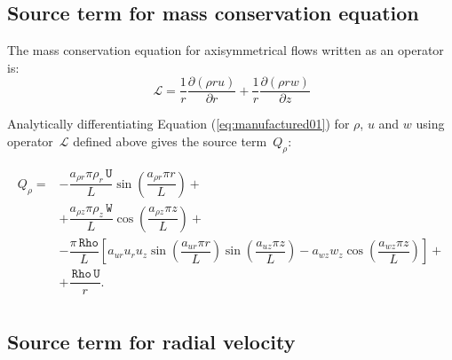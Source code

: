 \documentclass[10pt]{article}
\newcommand{\Diff}[2] {\dfrac{\partial( #1)}{\partial #2}}
\newcommand{\Lo}{\,\mathcal{L}}
\newcommand{\Rho}{\,\mathtt{Rho}}
\newcommand{\U}{\,\mathtt{U}}
\newcommand{\W}{\,\mathtt{W}}
\begin{document}
\subsection{Source term for mass conservation equation}

The mass conservation equation for axisymmetrical flows written as an operator is:
\begin{equation*}
 \Lo=  \dfrac{1}{r} \Diff{\rho r u}{r}+ \dfrac{1}{r}\Diff{\rho r w}{z}
\end{equation*}

Analytically differentiating Equation (\ref{eq:manufactured01}) for $\rho$, $u$ and $w$ using operator $\Lo$ defined above gives  the source term~$Q_{\rho}$:

\begin{equation}
 \begin{split}
Q_\rho  = &- \dfrac{a_{\rho r} \pi \rho_r \U}{L}\sin\left(\dfrac{a_{\rho r} \pi r}{L}\right)+ \\
&+\dfrac{a_{\rho z} \pi \rho_z \W }{L}\cos\left(\dfrac{a_{\rho z} \pi z}{L}\right)+ \\
&-\dfrac{ \pi \Rho}{L}\left[a_{ur} u_r u_z \sin\left(\dfrac{a_{ur} \pi r}{L}\right) \sin\left(\dfrac{a_{uz} \pi z}{L}\right)-a_{wz} w_z \cos\left(\dfrac{a_{wz} \pi z}{L}\right)\right]+ \\
&+\dfrac{\Rho \U}{r}.\\
\end{split}
\end{equation}
%
\subsection{Source term for radial velocity}
\end{document}
